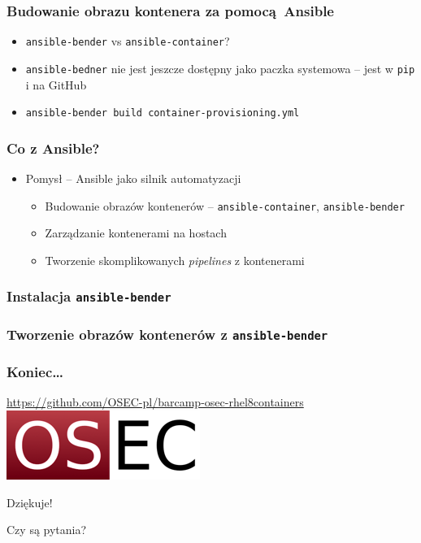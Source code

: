 \documentclass[dvipsnames,table]{beamer}
\begin{document}
\begin{frame}[fragile]
	\frametitle{Budowanie obrazu kontenera za pomocą Ansible}
%	
\begin{itemize}
	\item {\tt ansible-bender} vs {\tt ansible-container}?
	\item {\tt ansible-bedner} nie jest jeszcze dostępny jako paczka systemowa -- jest w {\tt pip} i na GitHub
	\item {\tt ansible-bender build container-provisioning.yml}
\end{itemize}
\end{frame}





\begin{frame}[fragile]
	\frametitle{Co z Ansible?}
	\begin{itemize}
		\item Pomysł -- Ansible jako silnik automatyzacji
		\begin{itemize}
			\item Budowanie obrazów kontenerów -- {\tt ansible-container}, {\tt ansible-bender}
			\item Zarządzanie kontenerami na hostach
			\item Tworzenie skomplikowanych {\it pipelines} z kontenerami
		\end{itemize}
	\end{itemize}
\end{frame}
%

\begin{frame}[fragile]
	\frametitle{Instalacja {\tt ansible-bender}}
%
\end{frame}

\begin{frame}[fragile]
	\frametitle{Tworzenie obrazów kontenerów z {\tt ansible-bender}}
%
\end{frame}

\begin{frame}
\frametitle{Koniec\ldots}
\begin{center}
\href{https://github.com/OSEC-pl/barcamp-osec-rhel8containers}{https://github.com/OSEC-pl/barcamp-osec-rhel8containers}
\includegraphics[scale=0.5]{img-oseclogo.png}

Dziękuje!

Czy są pytania?

\end{center}
\end{frame}
\end{document}
